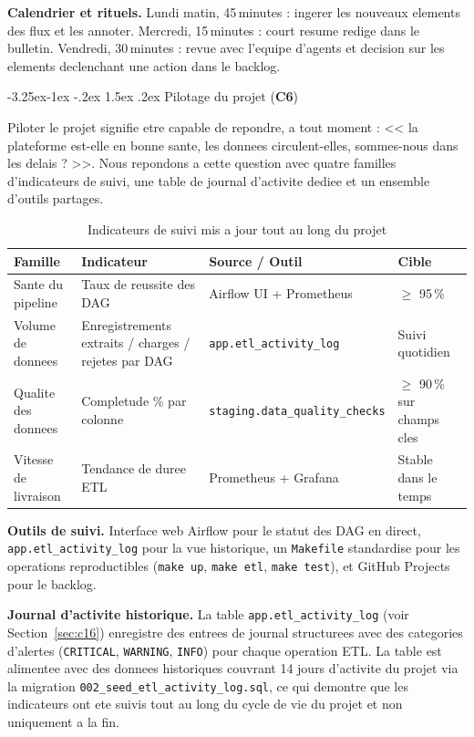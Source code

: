 \documentclass[a4paper,11pt,oneside,openany]{report}
\makeatletter
\renewcommand\subsection{\@startsection{subsection}{2}{\z@}%
  {-3.25ex\@plus -1ex \@minus -.2ex}%
  {1.5ex \@plus .2ex}%
  {\normalfont\large\bfseries\color{ntdarkgreen}}}
\newcommand{\competence}[1]{\textbf{\textcolor{ntgreen}{#1}}}
\makeatother
\begin{document}
\textbf{Calendrier et rituels.} Lundi matin, 45\,minutes : ingerer
les nouveaux elements des flux et les annoter. Mercredi, 15\,minutes :
court resume redige dans le bulletin. Vendredi, 30\,minutes : revue
avec l'equipe d'agents et decision sur les elements declenchant une
action dans le backlog.

\subsection{Pilotage du projet (\competence{C6})}

Piloter le projet signifie etre capable de repondre, a tout moment :
<< la plateforme est-elle en bonne sante, les donnees circulent-elles,
sommes-nous dans les delais ? >>. Nous repondons a cette question avec
quatre familles d'indicateurs de suivi, une table de journal
d'activite dediee et un ensemble d'outils partages.

\begin{table}[H]
\centering
\caption{Indicateurs de suivi mis a jour tout au long du projet}
\label{tab:tracking}
\begin{tabularx}{\textwidth}{L{3cm} L{4cm} L{4cm} L{3cm}}
\toprule
\textbf{Famille} & \textbf{Indicateur} & \textbf{Source / Outil} & \textbf{Cible} \\
\midrule
Sante du pipeline & Taux de reussite des DAG & Airflow UI + Prometheus & $\geq$ 95\,\% \\
Volume de donnees & Enregistrements extraits / charges / rejetes par DAG & \texttt{app.etl\_activity\_log} & Suivi quotidien \\
Qualite des donnees & Completude \% par colonne & \texttt{staging.data\_quality\_checks} & $\geq$ 90\,\% sur champs cles \\
Vitesse de livraison & Tendance de duree ETL & Prometheus + Grafana & Stable dans le temps \\
\bottomrule
\end{tabularx}
\end{table}

\textbf{Outils de suivi.} Interface web Airflow pour le statut des
DAG en direct, \texttt{app.etl\_activity\_log} pour la vue
historique, un \texttt{Makefile} standardise pour les operations
reproductibles (\texttt{make up}, \texttt{make etl},
\texttt{make test}), et GitHub Projects pour le backlog.

\textbf{Journal d'activite historique.} La table
\texttt{app.etl\_activity\_log} (voir Section~\ref{sec:c16})
enregistre des entrees de journal structurees avec des categories
d'alertes (\texttt{CRITICAL}, \texttt{WARNING}, \texttt{INFO}) pour
chaque operation ETL. La table est alimentee avec des donnees
historiques couvrant 14 jours d'activite du projet via la migration
\texttt{002\_seed\_etl\_activity\_log.sql}, ce qui demontre que les
indicateurs ont ete suivis tout au long du cycle de vie du projet et
non uniquement a la fin.
\end{document}
